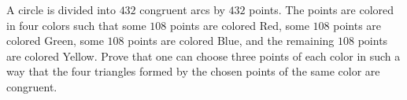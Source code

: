 A circle is divided into $432$ congruent arcs by $432$ points.  The points are colored in four colors such that some $108$ points are colored Red, some $108$ points are colored Green, some $108$ points are colored Blue, and the remaining $108$ points are colored Yellow.  Prove that one can choose three points of each color in such a way that the four triangles formed by the chosen points of the same color are congruent.